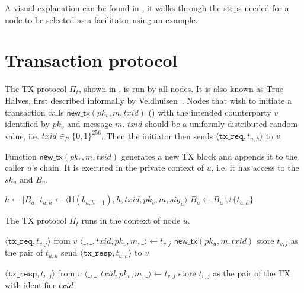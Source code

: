 A visual explanation can be found in ,
it walks through the steps needed for a node to be selected as a facilitator using an example.

\section{Transaction protocol}
\label{sec:tx-protocol}

The TX protocol $\Pi_t$, shown in , is run by all nodes.
It is also known as True Halves, first described informally by Veldhuisen~\cite[Chapter~3.2]{truehalves}.
Nodes that wish to initiate a transaction calls $\textsf{new\_tx}(pk_v, m, txid)$ () with the intended counterparty $v$ identified by $pk_v$ and message $m$.
$txid$ should be a uniformly distributed random value, i.e. $txid \in_R \{0, 1\}^{256}$.
Then the initiator then sends $\langle \texttt{tx\_req}, t_{u, h}\rangle$ to $v$.

\begin{algorithm}
    \caption{Function $\textsf{new\_tx}(pk_v, m, txid)$ generates a new TX block and appends it to the caller $u$'s chain.
    It is executed in the private context of $u$, i.e. it has access to the $sk_u$ and $B_u$.}
    \label{alg:new-tx}

    \begin{algorithmic}
    \State $h \gets |B_u|$
    \State $t_{u, h} \gets \langle \textsf{H}(b_{u, h - 1}), h, txid, pk_v, m, sig_u \rangle$
    \State $B_u \gets B_u \cup \{ t_{u, h} \}$
    \end{algorithmic}
\end{algorithm}

\begin{algorithm}
    \caption{The TX protocol $\Pi_t$ runs in the context of node $u$.}
    \label{alg:tx-proto}

    \begin{algorithmic}
        \Upon $\langle \texttt{tx\_req}, t_{v, j} \rangle$ from $v$
        \State $\langle \_, \_, txid, pk_v, m, \_ \rangle \gets t_{v, j}$
        \State $\textsf{new\_tx}(pk_u, m, txid)$
        \State store $t_{v, j}$ as the pair of $t_{u, h}$
        \State send $\langle \texttt{tx\_resp}, t_{u, h} \rangle$ to $v$

        \Upon $\langle \texttt{tx\_resp}, t_{v, j} \rangle$ from $v$
        \State $\langle \_, \_, txid, pk_v, m, \_ \rangle \gets t_{v, j}$
        \State store $t_{v, j}$ as the pair of the TX with identifier $txid$
    \end{algorithmic}
\end{algorithm}

